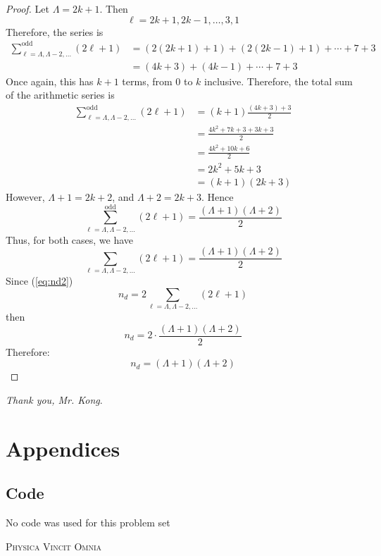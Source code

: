 \documentclass[12pt,a4paper]{article}
\begin{document}
\begin{solution_pset}
\begin{proof}
			Let $\Lambda = 2k + 1$. Then
			\[
				\ell = 2k+1, 2k-1,\ldots, 3, 1
			\]
			Therefore, the series is
			\begin{align*}
				\sum^{\text{odd}}_{\ell=\Lambda, \Lambda-2,\ldots}(2\ell+1) 
				&= (2(2k+1) + 1) + (2(2k-1) + 1) + \cdots + 7 + 3\\
				&= (4k+3) + (4k - 1) + \cdots + 7 + 3 
			\end{align*}
			Once again, this has $k+1$ terms, from $0$ to $k$ inclusive.
			Therefore, the total sum of the arithmetic series is
			\begin{align*}
				\sum^{\text{odd}}_{\ell=\Lambda, \Lambda-2,\ldots}(2\ell+1)
				&= (k+1)\frac{(4k+3) + 3}{2}\\
				&= \frac{4k^2 + 7k + 3 + 3k + 3}{2} \\
				&= \frac{4k^2 + 10k + 6}{2} \\
				&= 2k^2 + 5k + 3 \\
				&= (k+1)(2k+3)
			\end{align*}
			However, $\Lambda + 1 = 2k + 2$, and $\Lambda + 2 = 2k+3$. Hence
			\begin{equation}
				\sum^{\text{odd}}_{\ell=\Lambda, \Lambda-2,\ldots}(2\ell+1) = \frac{(\Lambda + 1)(\Lambda + 2)}{2} 
			\end{equation}
			Thus, for both cases, we have
			\begin{equation}
				\sum_{\ell=\Lambda, \Lambda-2,\ldots}(2\ell+1) = \frac{(\Lambda + 1)(\Lambda + 2)}{2} 
			\end{equation}
			Since (\ref{eq:nd2}) 
			\begin{equation}
				n_d = 2 \sum_{\ell = \Lambda, \Lambda - 2, \ldots} (2\ell+1)
			\end{equation}
			then
			\begin{equation}
				n_d = 2 \cdot \frac{(\Lambda + 1)(\Lambda + 2)}{2} 
			\end{equation}
			Therefore:
			\begin{equation}
				\boxed{
					n_d = (\Lambda + 1)(\Lambda + 2)
				}
			\end{equation}
		\end{proof}
			\vfill
			\begin{center}
			    \textit{Thank you, Mr. Kong}.
			\end{center}
	\end{solution_pset}
	\newpage

	 
	 
	\section*{Appendices}
		\label{appendix}
		\subsection*{Code} 
		No code was used for this problem set
	\vfill
	\begin{center}
		\textsc{Physica Vincit Omnia}
	\end{center}
\end{document}
